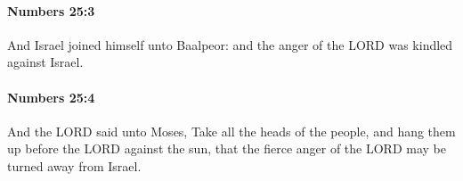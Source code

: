 		\paragraph{Numbers 25:3} %
			\label{NUMBERS-25-3}

			And Israel joined himself unto Baalpeor: and the anger of the LORD was kindled against Israel.


		\paragraph{Numbers 25:4} %
			\label{NUMBERS-25-4}

			And the LORD said unto Moses, Take all the heads of the people, and hang them up before the LORD against the sun, that the fierce anger of the LORD may be turned away from Israel.


